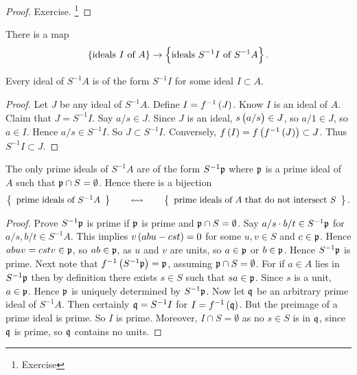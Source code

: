 \begin{proof}
Exercise. \footnote{Exercise}
\end{proof}

There is a map
$$ \cbr{\text{ideals} \ I \ \text{of} \ A} \to \cbr{\text{ideals} \ S^{-1}I \ \text{of} \ S^{-1}A}. $$

\begin{proposition}
Every ideal of $ S^{-1}A $ is of the form $ S^{-1}I $ for some ideal $ I \subset A $.
\end{proposition}

\begin{proof}
Let $ J $ be any ideal of $ S^{-1}A $. Define $ I = f^{-1}\br{J} $. Know $ I $ is an ideal of $ A $. Claim that $ J = S^{-1}I $. Say $ a / s \in J $. Since $ J $ is an ideal, $ s\br{a / s} \in J $, so $ a / 1 \in J $, so $ a \in I $. Hence $ a / s \in S^{-1}I $. So $ J \subset S^{-1}I $. Conversely, $ f\br{I} = f\br{f^{-1}\br{J}} \subset J $. Thus $ S^{-1}I \subset J $.
\end{proof}

\begin{theorem}
\label{thm:6.9}
The only prime ideals of $ S^{-1}A $ are of the form $ S^{-1}\mathfrak{p} $ where $ \mathfrak{p} $ is a prime ideal of $ A $ such that $ \mathfrak{p} \cap S = \emptyset $. Hence there is a bijection
$$ \correspondence{\text{prime ideals of} \ S^{-1}A}{\text{prime ideals of} \ A \ \text{that do not intersect} \ S}. $$
\end{theorem}

\begin{proof}
Prove $ S^{-1}\mathfrak{p} $ is prime if $ \mathfrak{p} $ is prime and $ \mathfrak{p} \cap S = \emptyset $. Say $ a / s \cdot b / t \in S^{-1}\mathfrak{p} $ for $ a / s, b / t \in S^{-1}A $. This implies $ v\br{abu - cst} = 0 $ for some $ u, v \in S $ and $ c \in \mathfrak{p} $. Hence $ abuv = cstv \in \mathfrak{p} $, so $ ab \in \mathfrak{p} $, as $ u $ and $ v $ are units, so $ a \in \mathfrak{p} $ or $ b \in \mathfrak{p} $. Hence $ S^{-1}\mathfrak{p} $ is prime. Next note that $ f^{-1}\br{S^{-1}\ppp} = \ppp $, assuming $ \mathfrak{p} \cap S = \emptyset $. For if $ a \in A $ lies in $ S^{-1}\mathfrak{p} $ then by definition there exists $ s \in S $ such that $ sa \in \mathfrak{p} $. Since $ s $ is a unit, $ a \in \mathfrak{p} $. Hence $ \mathfrak{p} $ is uniquely determined by $ S^{-1}\mathfrak{p} $. Now let $ \mathfrak{q} $ be an arbitrary prime ideal of $ S^{-1}A $. Then certainly $ \mathfrak{q} = S^{-1}I $ for $ I = f^{-1}\br{\qqq} $. But the preimage of a prime ideal is prime. So $ I $ is prime. Moreover, $ I \cap S = \emptyset $ as no $ s \in S $ is in $ \mathfrak{q} $, since $ \mathfrak{q} $ is prime, so $ \mathfrak{q} $ contains no units.
\end{proof}


